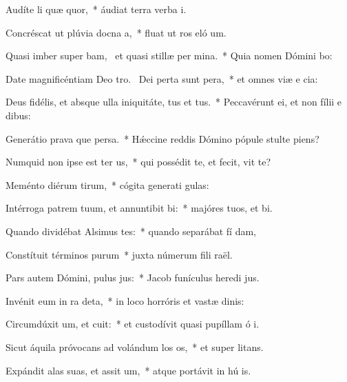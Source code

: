 \item Audíte li quæ quor,~* áudiat terra verba  i.
\item Concréscat ut plúvia docna a,~* fluat ut ros eló um.
\item Quasi imber super bam,~\pscross{} et quasi stillæ per mina.~* Quia nomen Dómini bo:
\item Date magnificéntiam Deo tro.~\pscross{} Dei perta sunt pera,~* et omnes viæ e cia:
\item Deus fidélis, et absque ulla iniquitáte, tus et tus.~* Peccavérunt ei, et non fílii e  dibus:
\item Generátio prava que persa.~* Hǽccine reddis Dómino pópule stulte  piens?
\item Numquid non ipse est ter us,~* qui possédit te, et fecit,  vit te?
\item Meménto diérum tirum,~* cógita generati gulas:
\item Intérroga patrem tuum, et annuntibit bi:~* majóres tuos, et  bi.
\item Quando dividébat Alsimus tes:~* quando separábat fí dam,
\item Constítuit términos purum~* juxta númerum fili raël.
\item Pars autem Dómini, pulus jus:~* Jacob funículus heredi jus.
\item Invénit eum in ra deta,~* in loco horróris et vastæ dinis:
\item Circumdúxit um, et cuit:~* et custodívit quasi pupíllam ó i.
\item Sicut áquila próvocans ad volándum los os,~* et super  litans.
\item Expándit alas suas, et assit um,~* atque portávit in hú is.
